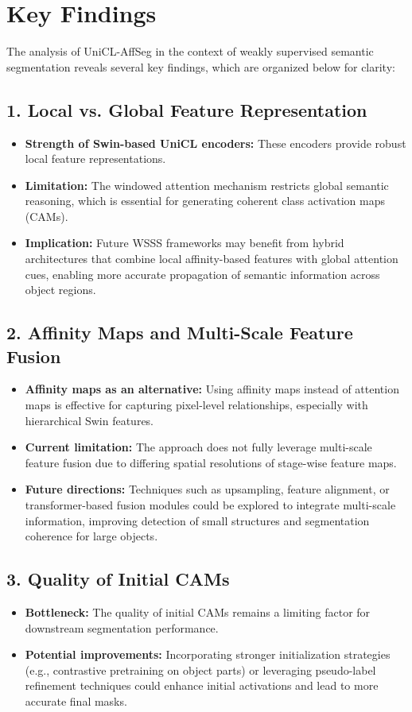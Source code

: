 
\section{Key Findings}
\label{sec:key_findings}


The analysis of UniCL-AffSeg in the context of weakly supervised semantic segmentation reveals several key findings, which are organized below for clarity:

\subsection*{1. Local vs. Global Feature Representation}
\begin{itemize}
	\item \textbf{Strength of Swin-based UniCL encoders:} These encoders provide robust local feature representations.
	\item \textbf{Limitation:} The windowed attention mechanism restricts global semantic reasoning, which is essential for generating coherent class activation maps (CAMs).
	\item \textbf{Implication:} Future WSSS frameworks may benefit from hybrid architectures that combine local affinity-based features with global attention cues, enabling more accurate propagation of semantic information across object regions.
\end{itemize}

\subsection*{2. Affinity Maps and Multi-Scale Feature Fusion}
\begin{itemize}
	\item \textbf{Affinity maps as an alternative:} Using affinity maps instead of attention maps is effective for capturing pixel-level relationships, especially with hierarchical Swin features.
	\item \textbf{Current limitation:} The approach does not fully leverage multi-scale feature fusion due to differing spatial resolutions of stage-wise feature maps.
	\item \textbf{Future directions:} Techniques such as upsampling, feature alignment, or transformer-based fusion modules could be explored to integrate multi-scale information, improving detection of small structures and segmentation coherence for large objects.
\end{itemize}

\subsection*{3. Quality of Initial CAMs}
\begin{itemize}
	\item \textbf{Bottleneck:} The quality of initial CAMs remains a limiting factor for downstream segmentation performance.
	\item \textbf{Potential improvements:} Incorporating stronger initialization strategies (e.g., contrastive pretraining on object parts) or leveraging pseudo-label refinement techniques could enhance initial activations and lead to more accurate final masks.
\end{itemize}

